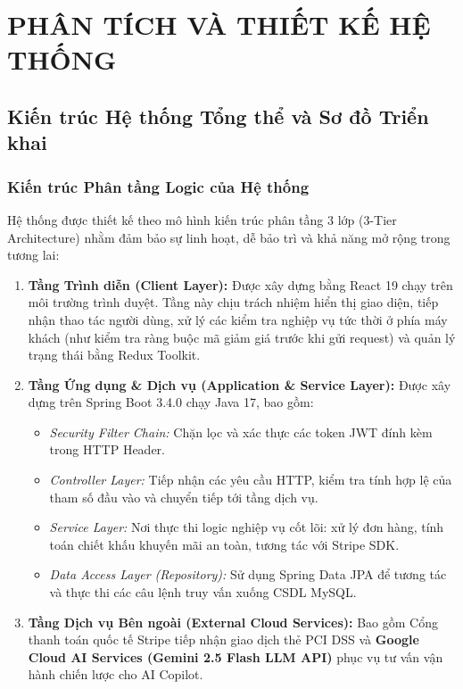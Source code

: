 \documentclass{uetgraduation}
\begin{document}
\chapter{PHÂN TÍCH VÀ THIẾT KẾ HỆ THỐNG}

\section{Kiến trúc Hệ thống Tổng thể và Sơ đồ Triển khai}
\subsection{Kiến trúc Phân tầng Logic của Hệ thống}
Hệ thống được thiết kế theo mô hình kiến trúc phân tầng 3 lớp (3-Tier Architecture) nhằm đảm bảo sự linh hoạt, dễ bảo trì và khả năng mở rộng trong tương lai:
\begin{enumerate}
    \item \textbf{Tầng Trình diễn (Client Layer):} Được xây dựng bằng React 19 chạy trên môi trường trình duyệt. Tầng này chịu trách nhiệm hiển thị giao diện, tiếp nhận thao tác người dùng, xử lý các kiểm tra nghiệp vụ tức thời ở phía máy khách (như kiểm tra ràng buộc mã giảm giá trước khi gửi request) và quản lý trạng thái bằng Redux Toolkit.
    \item \textbf{Tầng Ứng dụng \& Dịch vụ (Application \& Service Layer):} Được xây dựng trên Spring Boot 3.4.0 chạy Java 17, bao gồm:
    \begin{itemize}
        \item \textit{Security Filter Chain:} Chặn lọc và xác thực các token JWT đính kèm trong HTTP Header.
        \item \textit{Controller Layer:} Tiếp nhận các yêu cầu HTTP, kiểm tra tính hợp lệ của tham số đầu vào và chuyển tiếp tới tầng dịch vụ.
        \item \textit{Service Layer:} Nơi thực thi logic nghiệp vụ cốt lõi: xử lý đơn hàng, tính toán chiết khấu khuyến mãi an toàn, tương tác với Stripe SDK.
        \item \textit{Data Access Layer (Repository):} Sử dụng Spring Data JPA để tương tác và thực thi các câu lệnh truy vấn xuống CSDL MySQL.
    \end{itemize}
    \item \textbf{Tầng Dịch vụ Bên ngoài (External Cloud Services):} Bao gồm Cổng thanh toán quốc tế Stripe tiếp nhận giao dịch thẻ PCI DSS và \textbf{Google Cloud AI Services (Gemini 2.5 Flash LLM API)} phục vụ tư vấn vận hành chiến lược cho AI Copilot.
\end{enumerate}
\end{document}
